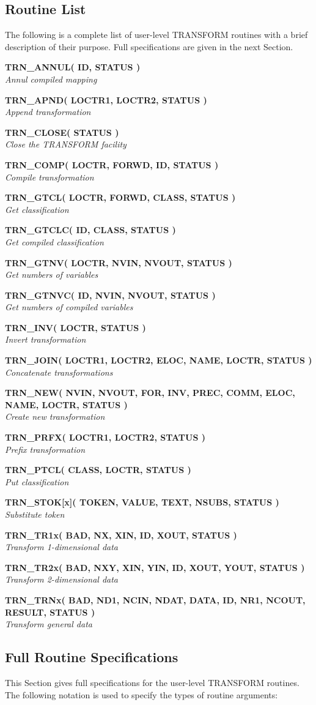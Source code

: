 \documentclass[twoside,nolof,11pt]{starlink}
\providecommand{\name}[1]{\small{#1}}
\providecommand{\noteroutine}[2]{\textbf{#1}\hspace*{\fill}\nopagebreak \\
                             \hspace*{3em}\emph{#2}\hspace*{\fill}\par}
\begin{document}
\subsection{Routine List}

The following is a complete list of user-level \name{TRANSFORM} routines
with a brief description of their purpose.
Full specifications are given in the next Section.

\noteroutine{TRN\_ANNUL( ID, STATUS )}
            { Annul compiled mapping}
\noteroutine{TRN\_APND( LOCTR1, LOCTR2, STATUS )}
            { Append transformation}
\noteroutine{TRN\_CLOSE( STATUS )}
            { Close the \name{TRANSFORM} facility}
\noteroutine{TRN\_COMP( LOCTR, FORWD, ID, STATUS )}
            { Compile transformation}
\noteroutine{TRN\_GTCL( LOCTR, FORWD, CLASS, STATUS )}
            { Get classification}
\noteroutine{TRN\_GTCLC( ID, CLASS, STATUS )}
            { Get compiled classification}
\noteroutine{TRN\_GTNV( LOCTR, NVIN, NVOUT, STATUS )}
            { Get numbers of variables}
\noteroutine{TRN\_GTNVC( ID, NVIN, NVOUT, STATUS )}
            { Get numbers of compiled variables}
\noteroutine{TRN\_INV( LOCTR, STATUS )}
            { Invert transformation}
\noteroutine{TRN\_JOIN( LOCTR1, LOCTR2, ELOC, NAME, LOCTR, STATUS )}
            { Concatenate transformations}
\noteroutine{TRN\_NEW( NVIN, NVOUT, FOR, INV, PREC, COMM, ELOC, NAME, LOCTR, STATUS )}
            { Create new transformation}
\noteroutine{TRN\_PRFX( LOCTR1, LOCTR2, STATUS )}
            { Prefix transformation}
\noteroutine{TRN\_PTCL( CLASS, LOCTR, STATUS )}
            { Put classification}
\noteroutine{TRN\_STOK[x]( TOKEN, VALUE, TEXT, NSUBS, STATUS )}
            { Substitute token}
\noteroutine{TRN\_TR1x( BAD, NX, XIN, ID, XOUT, STATUS )}
            { Transform 1-dimensional data}
\noteroutine{TRN\_TR2x( BAD, NXY, XIN, YIN, ID, XOUT, YOUT, STATUS )}
            { Transform 2-dimensional data}
\noteroutine{TRN\_TRNx( BAD, ND1, NCIN, NDAT, DATA, ID, NR1, NCOUT, RESULT, STATUS )}
            { Transform general data}

\newpage
\subsection{Full Routine Specifications}

This Section gives full specifications for the user-level \name{TRANSFORM}
routines.
The following notation is used to specify the types of routine arguments:
\end{document}

